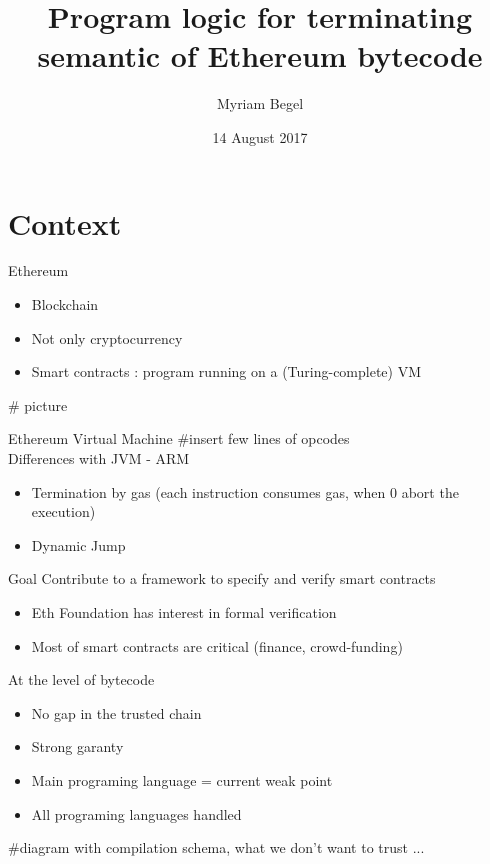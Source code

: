 \documentclass{beamer}
\title{Program logic for terminating semantic of Ethereum bytecode}
\author{Myriam Begel}
\date{14 August 2017}
\begin{document}
\maketitle


\section{Context}

\begin{frame}{Ethereum}
	\begin{itemize}
		\item Blockchain
		\item Not only cryptocurrency
		\item Smart contracts : program running on a (Turing-complete) VM
	\end{itemize}
	\# picture
\end{frame}

\begin{frame}{Ethereum Virtual Machine}
	\#insert few lines of opcodes \\
	Differences with JVM - ARM
	\begin{itemize}
		\item Termination by gas (each instruction consumes gas, when 0 abort the execution)
		\item Dynamic Jump
	\end{itemize}
\end{frame}

\begin{frame}{Goal}
	Contribute to a framework to specify and verify smart contracts
	\begin{itemize}
		\item Eth Foundation has interest in formal verification
		\item Most of smart contracts are critical (finance, crowd-funding)
	\end{itemize}
	At the level of bytecode
	\begin{itemize}
		\item No gap in the trusted chain
		\item Strong garanty
		\item Main programing language = current weak point
		\item All programing languages handled
	\end{itemize}
	\#diagram with compilation schema, what we don't want to trust ...
\end{frame}
\end{document}
